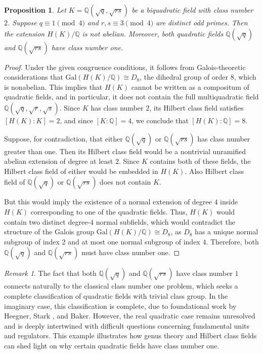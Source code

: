 \documentclass[12 pt]{amsart}
\newtheorem{prop}[thm]{Proposition}
\theoremstyle{definition}
\theoremstyle{remark}
\newtheorem{remark}{Remark}
\begin{document}
\begin{prop}
Let $K = \mathbb{Q}(\sqrt{q}, \sqrt{rs})$ be a biquadratic field with class number $2$. Suppose $q \equiv 1 \pmod{4}$ and $r, s \equiv 3 \pmod{4}$ are distinct odd primes. Then the extension $H(K)/\mathbb{Q}$ is not abelian. Moreover, both quadratic fields $\mathbb{Q}(\sqrt{q})$ and $\mathbb{Q}(\sqrt{rs})$ have class number one.
\end{prop}

\begin{proof}
Under the given congruence conditions, it follows from Galois-theoretic considerations that $\mathrm{Gal}(H(K)/\mathbb{Q}) \cong D_8$, the dihedral group of order $8$, which is nonabelian. This implies that $H(K)$ cannot be written as a compositum of quadratic fields, and in particular, it does not contain the full multiquadratic field $\mathbb{Q}(\sqrt{q}, \sqrt{r}, \sqrt{s})$.
Since $K$ has class number $2$, its Hilbert class field satisfies $[H(K) : K] = 2$, and since $[K : \mathbb{Q}] = 4$, we conclude that $[H(K) : \mathbb{Q}] = 8$.

Suppose, for contradiction, that either $\mathbb{Q}(\sqrt{q})$ or $\mathbb{Q}(\sqrt{rs})$ has class number greater than one. Then its Hilbert class field would be a nontrivial unramified abelian extension of degree at least $2$. Since $K$ contains both of these fields, the Hilbert class field of either would be embedded in $H(K)$. Also Hilbert class field of $\mathbb{Q}(\sqrt{q})$ or $\mathbb{Q}(\sqrt{rs})$ does not contain $K$.

But this would imply the existence of a normal extension of degree $4$ inside $H(K)$ corresponding to one of the quadratic fields. Thus, $H(K)$ would contain two distinct degree-$4$ normal subfields, which would contradict the structure of the Galois group $\mathrm{Gal}(H(K)/\mathbb{Q}) \cong D_8$, as $D_8$ has a unique normal subgroup of index $2$ and at most one normal subgroup of index $4$.
Therefore, both $\mathbb{Q}(\sqrt{q})$ and $\mathbb{Q}(\sqrt{rs})$ must have class number one.
\end{proof}

\begin{remark}
The fact that both $\mathbb{Q}(\sqrt{q})$ and $\mathbb{Q}(\sqrt{rs})$ have class number $1$ connects naturally to the classical class number one problem, which seeks a complete classification of quadratic fields with trivial class group. In the imaginary case, this classification is complete, due to foundational work by Heegner, Stark \cite{Sta66}, and Baker\cite{Bak71}. However, the real quadratic case remains unresolved and is deeply intertwined with difficult questions concerning fundamental units and regulators. This example illustrates how genus theory and Hilbert class fields can shed light on why certain quadratic fields have class number one.
\end{remark}
\end{document}
